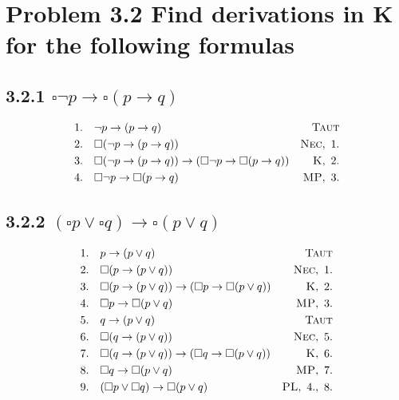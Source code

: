 \documentclass{report}
\begin{document}
	\pagestyle{fancy}
	\hfill
	
	\section*{Problem 3.2 Find derivations in \textbf{K} for the following formulas}
		\subsection*{3.2.1 $\square \neg p \rightarrow \square(p\rightarrow q)$}
			\begin{align*}
				& 1. \ \ \ \neg p \rightarrow (p \rightarrow q) & \textsc{Taut} \\
				& 2. \ \ \ \square ( \neg p \rightarrow (p \rightarrow q) ) & \textsc{Nec}, \ 1. \\
				& 3. \ \ \ \square ( \neg p \rightarrow (p \rightarrow q) ) \rightarrow ( \square \neg p \rightarrow \square (p \rightarrow q) ) & \textsc{K}, \ 2. \\
				& 4. \ \ \ \square \neg p \rightarrow \square (p \rightarrow q) & \textsc{MP}, \ 3.
			\end{align*}
		\subsection*{3.2.2 $(\square p \vee \square q) \rightarrow \square (p \vee q)$}
			\begin{align*}
				& 1. \ \ \ p \rightarrow (p \vee q) & \textsc{Taut} \\
				& 2. \ \ \ \square ( p \rightarrow (p \vee q) ) & \textsc{Nec}, \ 1. \\
				& 3. \ \ \ \square ( p \rightarrow (p \vee q) ) \rightarrow ( \square p \rightarrow \square (p \vee q) ) & \textsc{K}, \ 2. \\
				& 4. \ \ \ \square p \rightarrow \square (p \vee q) & \textsc{MP}, \ 3. \\
				& 5. \ \ \ q \rightarrow (p \vee q) & \textsc{Taut} \\
				& 6. \ \ \ \square ( q \rightarrow (p \vee q) ) & \textsc{Nec}, \ 5. \\
				& 7. \ \ \ \square ( q \rightarrow (p \vee q) ) \rightarrow ( \square q \rightarrow \square (p \vee q) ) & \textsc{K}, \ 6. \\
				& 8. \ \ \ \square q \rightarrow \square (p \vee q) & \textsc{MP}, \ 7. \\
				& 9. \ \ \ (\square p \vee \square q) \rightarrow \square (p \vee q) & \textsc{PL}, \ 4., \ 8.
			\end{align*}
\end{document}
